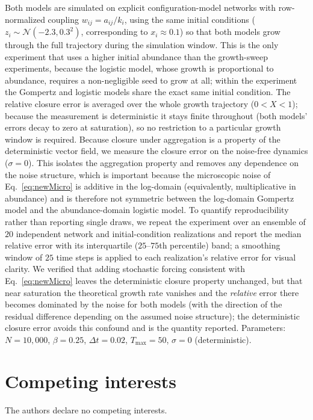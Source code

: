 \documentclass{article}
\begin{document}
Both models are simulated on explicit configuration-model networks with row-normalized coupling $w_{ij} = a_{ij}/k_i$, using the same initial conditions ($z_i \sim \mathcal{N}(-2.3, 0.3^2)$, corresponding to $x_i \approx 0.1$) so that both models grow through the full trajectory during the simulation window. This is the only experiment that uses a higher initial abundance than the growth-sweep experiments, because the logistic model, whose growth is proportional to abundance, requires a non-negligible seed to grow at all; within the experiment the Gompertz and logistic models share the exact same initial condition. The relative closure error is averaged over the whole growth trajectory ($0 < X < 1$); because the measurement is deterministic it stays finite throughout (both models' errors decay to zero at saturation), so no restriction to a particular growth window is required. Because closure under aggregation is a property of the deterministic vector field, we measure the closure error on the noise-free dynamics ($\sigma = 0$). This isolates the aggregation property and removes any dependence on the noise structure, which is important because the microscopic noise of Eq.\ \ref{eq:newMicro} is additive in the log-domain (equivalently, multiplicative in abundance) and is therefore not symmetric between the log-domain Gompertz model and the abundance-domain logistic model. To quantify reproducibility rather than reporting single draws, we repeat the experiment over an ensemble of $20$ independent network and initial-condition realizations and report the median relative error with its interquartile ($25$--$75$th percentile) band; a smoothing window of $25$ time steps is applied to each realization's relative error for visual clarity. We verified that adding stochastic forcing consistent with Eq.\ \ref{eq:newMicro} leaves the deterministic closure property unchanged, but that near saturation the theoretical growth rate vanishes and the \emph{relative} error there becomes dominated by the noise for both models (with the direction of the residual difference depending on the assumed noise structure); the deterministic closure error avoids this confound and is the quantity reported. Parameters: $N = 10{,}000$, $\beta = 0.25$, $\Delta t = 0.02$, $T_{\max} = 50$, $\sigma = 0$ (deterministic).

\section*{Competing interests}
The authors declare no competing interests.
\end{document}
